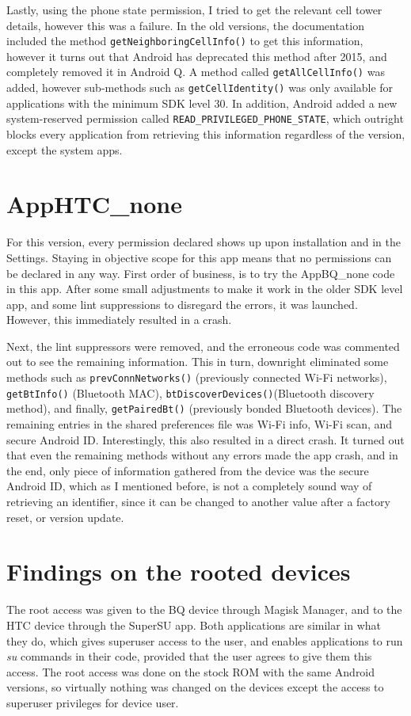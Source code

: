 \documentclass[
  a4paper,  %
  twoside,  %
  bibliography=totoc,
  headsepline,
  cleardoublepage=empty,
  parskip=half,
  draft=false,
  open=any
]{scrbook}
\begin{document}
Lastly, using the phone state permission, I tried to get the relevant cell tower details, however this was a failure. In the old versions, the documentation included the method \texttt{getNeighboringCellInfo()} to get this information, however it turns out that Android has deprecated this method after 2015, and completely removed it in Android Q. A method called \texttt{getAllCellInfo()} was added, however sub-methods such as \texttt{getCellIdentity()} was only available for applications with the minimum SDK level 30. In addition, Android added a new system-reserved permission called \texttt{READ\_PRIVILEGED\_PHONE\_STATE}, which outright blocks every application from retrieving this information regardless of the version, except the system apps.


\section{AppHTC\_none}
For this version, every permission declared shows up upon installation and in the Settings. Staying in objective scope for this app means that no permissions can be declared in any way. First order of business, is to try the AppBQ\_none code in this app. After some small adjustments to make it work in the older SDK level app, and some lint suppressions to disregard the errors, it was launched. However, this immediately resulted in a crash.

Next, the lint suppressors were removed, and the erroneous code was commented out to see the remaining information. This in turn, downright eliminated some methods such as \texttt{prevConnNetworks()} (previously connected Wi-Fi networks), \texttt{getBtInfo()} (Bluetooth MAC), \texttt{btDiscoverDevices()}(Bluetooth discovery method), and finally, \texttt{getPairedBt()} (previously bonded Bluetooth devices). The remaining entries in the shared preferences file was Wi-Fi info, Wi-Fi scan, and secure Android ID. Interestingly, this also resulted in a direct crash. It turned out that even the remaining methods without any errors made the app crash, and in the end, only piece of information gathered from the device was the secure Android ID, which as I mentioned before, is not a completely sound way of retrieving an identifier, since it can be changed to another value after a factory reset, or version update.

\section{Findings on the rooted devices}
The root access was given to the BQ device through Magisk Manager, and to the HTC device through the SuperSU app. Both applications are similar in what they do, which gives superuser access to the user, and enables applications to run \textit{su} commands in their code, provided that the user agrees to give them this access. The root access was done on the stock ROM with the same Android versions, so virtually nothing was changed on the devices except the access to superuser privileges for device user. 
\end{document}

